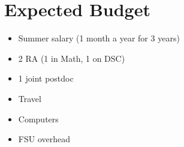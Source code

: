 \documentclass[11pt]{article}
\begin{document}
\section{Expected Budget}
\begin{itemize}
  \item Summer salary (1 month a year for 3 years)
  \item 2 RA (1 in Math, 1 on DSC)
  \item 1 joint postdoc
  \item Travel
  \item Computers
  \item FSU overhead
\end{itemize}





\end{document}
